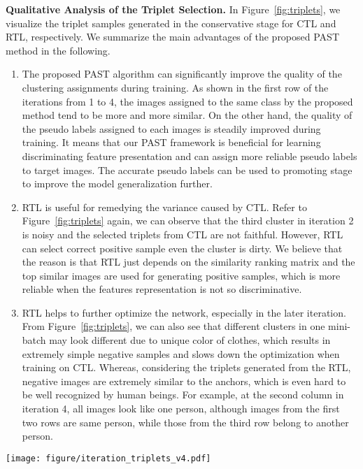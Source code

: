 \documentclass[10pt,twocolumn,letterpaper]{article}
\begin{document}
\textbf{Qualitative Analysis of the Triplet Selection.}
In Figure~\ref{fig:triplets}, we visualize the triplet samples generated in the conservative stage for CTL and RTL, respectively. We summarize the main advantages of the proposed PAST method in the following.
\begin{enumerate}
\item The proposed PAST algorithm can significantly improve the quality of the clustering assignments during training.
As shown in the first row of the iterations from 1 to 4, the images assigned to the same class by the proposed method tend to be more and more similar. On the other hand, the quality of the pseudo labels assigned to each images is steadily improved during training. 
It means that our PAST framework is beneficial for learning discriminating
feature presentation and can assign more reliable pseudo labels to target images. 
The accurate pseudo labels can be used to promoting stage to improve the model generalization further.
\item RTL is useful for remedying the variance caused by CTL. Refer to Figure~\ref{fig:triplets} again, we can observe that the third cluster in iteration 2 is noisy and the selected triplets from CTL are not faithful. 
However, RTL can select correct positive sample even the cluster is dirty. 
We believe that the reason is that RTL just depends on the similarity ranking matrix and the top  similar images are used for generating positive samples, which is more reliable when the features representation is not so discriminative. 
\item RTL helps to further optimize the network, especially in the later iteration. From Figure~\ref{fig:triplets}, we can also see that different clusters in one mini-batch may look different due to unique color of clothes, which results in extremely simple negative samples and slows down the optimization when training on CTL. 
Whereas, considering the triplets generated from the RTL, negative images are extremely similar to the anchors, which is even hard to be well recognized by human beings. For example, at the second column in iteration 4, all images look like one person, although images from the first two rows are same person, while those from the third row belong to another person. 
\end{enumerate}

\begin{figure*}[tbp]
\centering
\texttt{[image: figure/iteration\_triplets\_v4.pdf]}
\caption{Quality of the triplet selection over training iterations. Images from different clusters are divided by \textcolor{yellow}{\textbf{yellow line}}. The \textcolor{red}{\textbf{red line}} means generated triplets are not completely correct, while \textcolor{green}{\textbf{green line}} represents generated triplets are completely correct. 
The solid line and dashed line are for triplets, which are generated from CTL and RTL respectively. 
We use Duke~\cite{duke} as the source domain and Market-1501~\cite{market1501} as the target domain.}
\label{fig:triplets}
\end{figure*}
\end{document}
